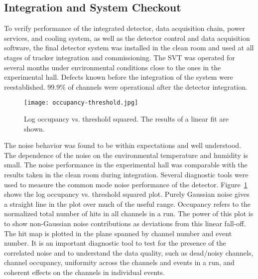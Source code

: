 %
%

%

\subsection{Integration and System Checkout}

To verify performance of the integrated detector, data acquisition chain, power services, and cooling system, as well as the detector control and data acquisition software, the final detector system was installed in the clean room and used at all stages of tracker integration and commissioning. The SVT was operated for several months under environmental conditions close to the ones in the experimental hall. Defects known before the integration of the system were reestablished. 99.9$\%$ of channels were operational after the detector integration. 
 
\begin{figure}[hbt] 
\centering 
\texttt{[image: occupancy-threshold.jpg]}
\caption{Log occupancy vs. threshold squared. The results of a linear fit are shown.}
\label{fig:occupancy-threshold}
\end{figure}

The noise behavior was found to be within expectations and well understood. The dependence of the noise on the environmental temperature and humidity is small. The noise performance in the experimental hall was comparable with the results taken in the clean room during integration. Several diagnostic tools were used to measure the common mode noise performance of the detector. Figure~\ref{fig:occupancy-threshold} shows the log occupancy vs. threshold squared plot. Purely Gaussian noise gives a straight line in the plot over much of the useful range. Occupancy refers to the normalized total number of hits in all channels in a run. The power of this plot is to show non-Gaussian noise contributions as deviations from this linear fall-off. The hit map is plotted in the plane spanned by channel number and event number. It is an important diagnostic tool to test for the presence of the correlated noise and to understand the data quality, such as dead/noisy channels, channel occupancy, uniformity across the channels and events in a run, and coherent effects on the channels in individual events.

